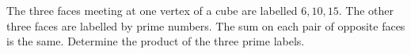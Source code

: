 The three faces meeting at one vertex of a cube are labelled $6,10,15$. The other three faces are labelled by prime numbers. The sum on each pair of opposite faces is the same. Determine the product of the three prime labels.
